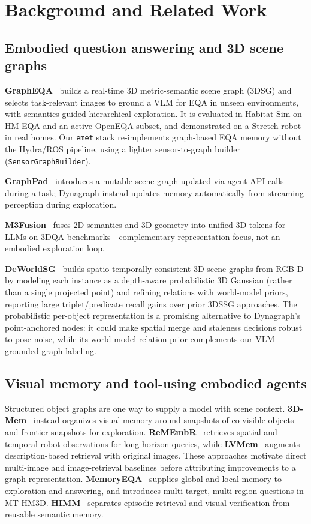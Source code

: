 \section{Background and Related Work}
\label{sec:background}

\subsection{Embodied question answering and 3D scene graphs}

\textbf{GraphEQA}~\citep{saxena2024grapheqa} builds a real-time 3D metric-semantic scene graph (3DSG) and selects task-relevant images to ground a VLM for EQA in unseen environments, with semantics-guided hierarchical exploration.
It is evaluated in Habitat-Sim on HM-EQA and an active OpenEQA subset, and demonstrated on a Stretch robot in real homes.
Our \texttt{emet} stack re-implements graph-based EQA memory without the Hydra/ROS pipeline, using a lighter sensor-to-graph builder (\texttt{SensorGraphBuilder}).

\textbf{GraphPad}~\citep{ali2025graphpad} introduces a mutable scene graph updated via agent API calls during a task; Dynagraph instead updates memory automatically from streaming perception during exploration.

\textbf{M3Fusion}~\citep{mao2026m3fusion} fuses 2D semantics and 3D geometry into unified 3D tokens for LLMs on 3DQA benchmarks---complementary representation focus, not an embodied exploration loop.

\textbf{DeWorldSG}~\citep{kim2026deworldsg} builds spatio-temporally consistent 3D scene graphs from RGB-D by modeling each instance as a depth-aware probabilistic 3D Gaussian (rather than a single projected point) and refining relations with world-model priors, reporting large triplet/predicate recall gains over prior 3DSSG approaches.
The probabilistic per-object representation is a promising alternative to Dynagraph's point-anchored nodes: it could make spatial merge and staleness decisions robust to pose noise, while its world-model relation prior complements our VLM-grounded graph labeling.

\subsection{Visual memory and tool-using embodied agents}

Structured object graphs are one way to supply a model with scene context.
\textbf{3D-Mem}~\citep{yang2025threedmem} instead organizes visual memory around snapshots of co-visible objects and frontier snapshots for exploration.
\textbf{ReMEmbR}~\citep{anwar2024remembr} retrieves spatial and temporal robot observations for long-horizon queries, while \textbf{LVMem}~\citep{khoruzhaya2026lvmem} augments description-based retrieval with original images.
These approaches motivate direct multi-image and image-retrieval baselines before attributing improvements to a graph representation.
\textbf{MemoryEQA}~\citep{zhai2025memoryeqa} supplies global and local memory to exploration and answering, and introduces multi-target, multi-region questions in MT-HM3D.
\textbf{HIMM}~\citep{li2026himm} separates episodic retrieval and visual verification from reusable semantic memory.

